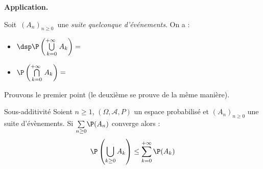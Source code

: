 \documentclass[a4paper,10pt]{report}
\newcommand{\Sum}[2]{\ensuremath{\textstyle{\sum\limits_{#1}^{#2}}}}
\begin{document}
\begin{itemize}
\medskip

%
%
 
\textbf{Application.}

Soit $\,(A_n)_{n \geq 0}\,$ une \emph{suite quelconque d'événements}. On a :
\begin{itemize}
\item $\dsp\P \left(\bigcup\limits_{k=0}^{+\infty\ } A_k\right) = \phantom{
\lim\limits_{n\to+\infty}\!\!\P\left(\bigcup\limits_{k=0}^{n} A_k\right) 
\quad}$ 
\item $\P \left(\bigcap\limits_{k=0}^{+\infty\ } A_k\right) = 
\phantom{\lim\limits_{n\to+\infty}\!\!\P\left(\bigcap\limits_{k=0}^{n} A_k\right)} $
\end{itemize}

\medskip

Prouvons le premier point (le deuxième se prouve de la même manière).

\vspace{7cm}


\begin{Theoreme}{Sous-additivité}
Soient $n \geq 1$, $(\Omega,\mathcal{A},P)$ un espace probabilisé et $(A_n)_{n \geq 0}$ une suite d'évènements. Si $\Sum{n \geq 0}{} \P(A_n)$ converge alors :
$$ \P \left(\bigcup_{k \geq 0} A_k \right) \leq \sum_{k=0}^{+ \infty} \P(A_k)$$
\end{Theoreme}

\begin{Demonstration}{}


\end{Demonstration}
\end{itemize}
\end{document}
